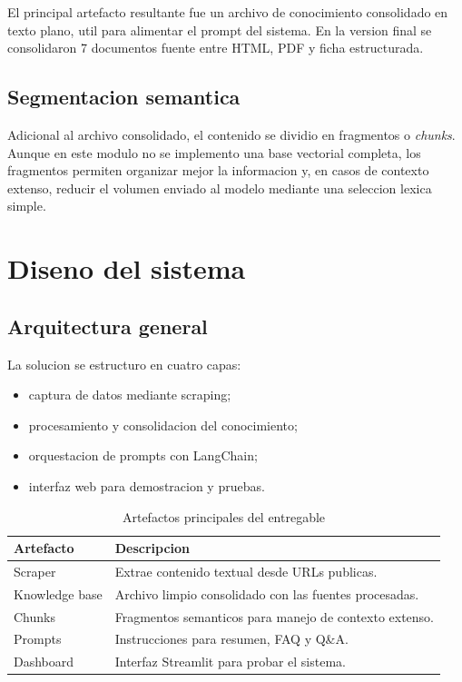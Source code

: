 \documentclass[journal]{IEEEtran}
\begin{document}
El principal artefacto resultante fue un archivo de conocimiento consolidado en texto plano, util para alimentar el prompt del sistema. En la version final se consolidaron 7 documentos fuente entre HTML, PDF y ficha estructurada.

\subsection{Segmentacion semantica}
Adicional al archivo consolidado, el contenido se dividio en fragmentos o \textit{chunks}. Aunque en este modulo no se implemento una base vectorial completa, los fragmentos permiten organizar mejor la informacion y, en casos de contexto extenso, reducir el volumen enviado al modelo mediante una seleccion lexica simple.

\section{Diseno del sistema}
\subsection{Arquitectura general}
La solucion se estructuro en cuatro capas:

\begin{itemize}
\item captura de datos mediante scraping;
\item procesamiento y consolidacion del conocimiento;
\item orquestacion de prompts con LangChain;
\item interfaz web para demostracion y pruebas.
\end{itemize}

\begin{table}[htbp]
\caption{Artefactos principales del entregable}
\centering
\begin{tabular}{p{3.0cm} p{4.5cm}}
\toprule
\textbf{Artefacto} & \textbf{Descripcion} \\
\midrule
Scraper & Extrae contenido textual desde URLs publicas. \\
Knowledge base & Archivo limpio consolidado con las fuentes procesadas. \\
Chunks & Fragmentos semanticos para manejo de contexto extenso. \\
Prompts & Instrucciones para resumen, FAQ y Q\&A. \\
Dashboard & Interfaz Streamlit para probar el sistema. \\
\bottomrule
\end{tabular}
\label{tab:artefactos}
\end{table}
\end{document}
